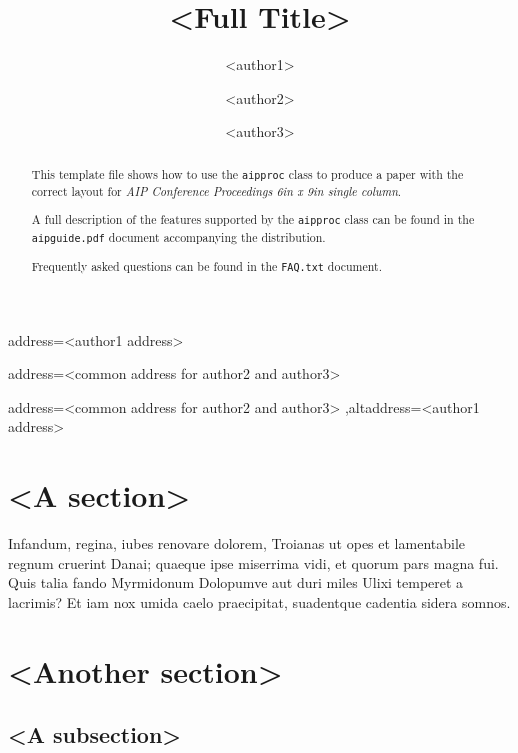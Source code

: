 \documentclass[
    ,final            %
  ]
  {aipproc}
\begin{document}
\title{<Full Title>}


\author{<author1>}{
  address={<author1 address>}
}

\author{<author2>}{
  address={<common address for author2 and author3>}
}

\author{<author3>}{
  address={<common address for author2 and author3>}
  ,altaddress={<author1 address>} %
}


\begin{abstract}
 This template file shows how to use the \texttt{aipproc} class to
 produce a paper with the correct layout for \emph{%
   AIP Conference Proceedings  6in   x 9in single column}.

 A full description of the features supported by the \texttt{aipproc}
 class can be found in the \texttt{aipguide.pdf} document accompanying
 the distribution.

 Frequently asked questions can be found in the \texttt{FAQ.txt}
 document.
\end{abstract}

\maketitle


\section{<A section>}

  Infandum, regina, iubes renovare dolorem, Troianas ut opes et
  lamentabile regnum cruerint Danai; quaeque ipse miserrima vidi, et
  quorum pars magna fui. Quis talia fando Myrmidonum Dolopumve aut
  duri miles Ulixi temperet a lacrimis? Et iam nox umida caelo
  praecipitat, suadentque cadentia sidera somnos.

\section{<Another section>}

\subsection{<A subsection>}
\end{document}
